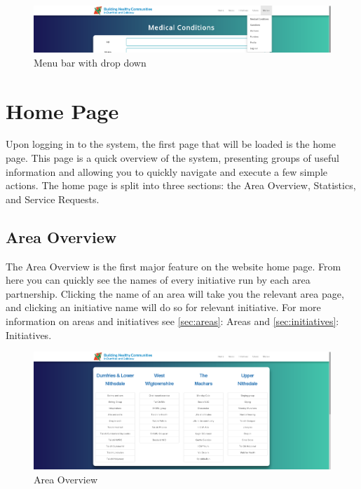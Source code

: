\documentclass{bhcguides}
\begin{document}
\begin{figure}[h!]
 \centerline{\includegraphics[width=\textwidth, height=\textheight, keepaspectratio]{menubar.png}}
 \caption{Menu bar with drop down}
 \label{fig:initialLogin}
\end{figure}

\section{Home Page}
\label{sec:homepage}

Upon logging in to the system, the first page that will be loaded is the home page. This page is a quick overview of the system, presenting groups of useful information and allowing you to quickly navigate and execute a few simple actions. The home page is split into three sections: the Area Overview, Statistics, and Service Requests.

\subsection{Area Overview}
\label{ssec:areaoverview}

The Area Overview is the first major feature on the website home page. From here you can quickly see the names of every initiative run by each area partnership. Clicking the name of an area will take you the relevant area page, and clicking an initiative name will do so for relevant initiative. For more information on areas and initiatives see \autoref{sec:areas}: Areas and \autoref{sec:initiatives}: Initiatives.

\begin{figure}[h!]
 \centerline{\includegraphics[width=\textwidth, height=\textheight, keepaspectratio]{homepage1.png}}
 \caption{Area Overview}
 \label{fig:homePage1}
\end{figure}
\end{document}
